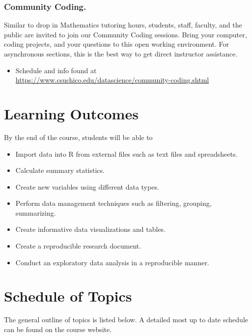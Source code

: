 \documentclass[
  11pt,
]{article}
\providecommand{\tightlist}{%
  \setlength{\itemsep}{0pt}\setlength{\parskip}{0pt}}
\begin{document}
\subsubsection{Community Coding.}\label{community-coding.}

Similar to drop in Mathematics tutoring hours, students, staff, faculty,
and the public are invited to join our Community Coding sessions. Bring
your computer, coding projects, and your questions to this open working
environment. For asynchronous sections, this is the best way to get
direct instructor assistance.

\begin{itemize}
\tightlist
\item
  Schedule and info found at
  \url{https://www.csuchico.edu/datascience/community-coding.shtml}
\end{itemize}

\section{Learning Outcomes}\label{learning-outcomes}

By the end of the course, students will be able to

\begin{itemize}
\tightlist
\item
  Import data into R from external files such as text files and
  spreadsheets.
\item
  Calculate summary statistics.
\item
  Create new variables using different data types.
\item
  Perform data management techniques such as filtering, grouping,
  summarizing.
\item
  Create informative data visualizations and tables.
\item
  Create a reproducible research document.
\item
  Conduct an exploratory data analysis in a reproducible manner.
\end{itemize}

\section{Schedule of Topics}\label{schedule-of-topics}

The general outline of topics is listed below. A detailed most up to
date schedule can be found on the course website.
\end{document}
